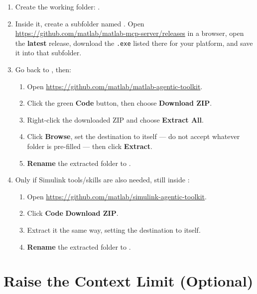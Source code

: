 \documentclass[11pt, letterpaper]{article}
\begin{document}
\begin{enumerate}
  \item Create the working folder: .

  \item Inside it, create a subfolder named . Open\\
        \url{https://github.com/matlab/matlab-mcp-server/releases} in a browser, open the
        \textbf{latest} release, download the \texttt{.exe} listed there for your platform, and
        save it into that subfolder.

  \item Go back to , then:
  \begin{enumerate}[label=(\alph*)]
    \item Open \url{https://github.com/matlab/matlab-agentic-toolkit}.
    \item Click the green \textbf{Code} button, then choose \textbf{Download ZIP}.
    \item Right-click the downloaded ZIP and choose \textbf{Extract All}.
    \item Click \textbf{Browse}, set the destination to  itself ---
          do not accept whatever folder is pre-filled --- then click \textbf{Extract}.
    \item \textbf{Rename} the extracted  folder to
          .
  \end{enumerate}

  \item Only if Simulink tools/skills are also needed, still inside :
  \begin{enumerate}[label=(\alph*)]
    \item Open \url{https://github.com/matlab/simulink-agentic-toolkit}.
    \item Click \textbf{Code} \textrightarrow{} \textbf{Download ZIP}.
    \item Extract it the same way, setting the destination to  itself.
    \item \textbf{Rename} the extracted  folder to
          .
  \end{enumerate}
\end{enumerate}

\section{Raise the Context Limit (Optional)}
\end{document}
